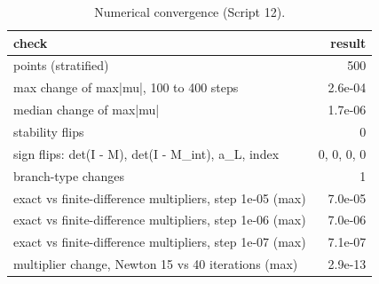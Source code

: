 \begin{table}
\caption{Numerical convergence (Script 12).}
\label{tab:T8_convergence}
\begin{ruledtabular}
\begin{tabular}{lr}
check & result \\
\hline
points (stratified) & 500 \\
max change of max|mu|, 100 to 400 steps & 2.6e-04 \\
median change of max|mu| & 1.7e-06 \\
stability flips & 0 \\
sign flips: det(I - M), det(I - M\_int), a\_L, index & 0, 0, 0, 0 \\
branch-type changes & 1 \\
exact vs finite-difference multipliers, step 1e-05 (max) & 7.0e-05 \\
exact vs finite-difference multipliers, step 1e-06 (max) & 7.0e-06 \\
exact vs finite-difference multipliers, step 1e-07 (max) & 7.1e-07 \\
multiplier change, Newton 15 vs 40 iterations (max) & 2.9e-13 \\
\end{tabular}
\end{ruledtabular}
\end{table}